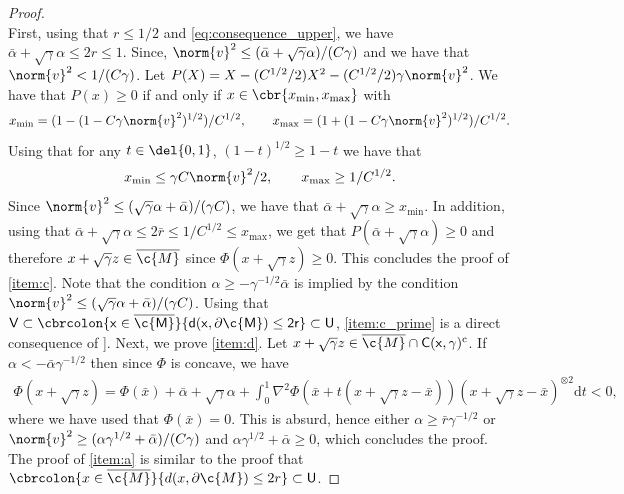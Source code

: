 \begin{proof}
\begin{equation}
	\end{equation}
	First, using that $r\leq 1/2$ and \eqref{eq:consequence_upper}, we have $\bar{\alpha} + \sqrt{\gamma}\alpha \leq 2r \leq 1$.
	Since, $\norm{v}^2 \leq (\bar{\alpha} +\sqrt{\gamma} \alpha)/(C\gamma)$ and we have that $\norm{v}^2 < 1/(C \gamma)$.
	Let $P(X) = X - (C^{1/2}/2)X^2 - (C^{1/2}/2)\gamma\norm{v}^2$.
	We have that $P(x) \geq 0$ if and only if $x \in \cbr{x_{\min}, x_{\max}}$ with \begin{equation} x_{\min} = (1 -(1 -C\gamma \norm{v}^2)^{1/2})/C^{1/2}, \qquad x_{\max} = (1 +(1 -C\gamma \norm{v}^2)^{1/2})/C^{1/2}.
	\end{equation}
	Using that for any $t \in \del{0,1}$, $(1-t)^{1/2} \geq 1 - t$ we have that \begin{equation} x_{\min} \leq \gamma C \norm{v}^2/2 , \qquad x_{\max} \geq 1/C^{1/2} .
	\end{equation}
	Since $\norm{v}^2 \leq (\sqrt{\gamma} \alpha + \bar{\alpha})/(\gamma C)$, we have that $\bar{\alpha} + \sqrt{\gamma} \alpha \geq x_{\min}$.
	In addition, using that $\bar{\alpha} + \sqrt{\gamma} \alpha \leq 2 \bar{r} \leq 1/C^{1/2} \leq x_{\mathrm{max}}$, we get that $P(\bar{\alpha} + \sqrt{\gamma}\alpha) \geq 0$ and therefore $x + \sqrt{\gamma}z \in \cl{\c{M}}$ since $\Phi(x+ \sqrt{\gamma}z) \geq 0$.
	This concludes the proof of \ref{item:c}.
	Note that the condition $\alpha \geq -\gamma^{-1/2} \bar{\alpha}$ is implied by the condition $\norm{v}^2 \leq (\sqrt{\gamma} \alpha + \bar{\alpha})/(\gamma C)$.
	Using that $\sf{V} \subset \cbrcolon{x \in \cl{\c{M}}}{d(x,\partial \c{M}) \leq 2r} \subset \sf{U}$, \ref{item:c_prime} is a direct consequence of \cite[Theorem 6.24]{lee2013smooth}].
	Next, we prove \ref{item:d}.
	Let $x + \sqrt{\gamma}z \in \cl{\c{M}} \cap \sf{C}(x,\gamma)^\mathrm{c}$.
	If $\alpha <-\bar{\alpha}\gamma^{-1/2}$ then since $\Phi$ is concave, we have \begin{align} \Phi(x+\sqrt{\gamma}z) = \textstyle{\Phi(\bar{x}) + \bar{\alpha} + \sqrt{\gamma} \alpha + \int_0^1 \nabla^2 \Phi(\bar{x} + t(x+\sqrt{\gamma}z-\bar{x}))(x+\sqrt{\gamma}z-\bar{x})^{\otimes 2} \mathrm{d} t } < 0 , \end{align} where we have used that $\Phi(\bar{x}) = 0$.
	This is absurd, hence either $\alpha \geq \bar{r}\gamma^{-1/2}$ or $\norm{v}^2 \geq ( \alpha \gamma^{1/2} + \bar{\alpha})/(C\gamma)$ and $\alpha \gamma^{1/2} + \bar{\alpha} \geq 0$, which concludes the proof.
	The proof of \ref{item:a} is similar to the proof that $\cbrcolon{x \in \cl{\c{M}}}{d(x, \partial \c{M}) \leq 2r } \subset \sf{U}$.

\end{proof}

